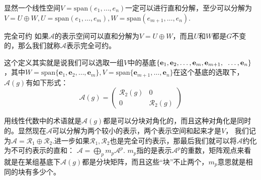 显然一个线性空间$V=\mathrm{span}(e_1,\ldots,e_n)$一定可以进行直和分解，至少可以分解为$V=U\oplus W,U=\mathrm{span}(e_1,\ldots,e_m),W=\mathrm{span}(e_{m+1},\ldots,e_n)$.
\begin{define}{完全可约}
    如果$\mathscr{A}$的表示空间可以直和分解为$V=U\oplus W$，而且$U$和$W$都是$G$不变的，那么我们就称$\mathscr{A}$表示完全可约。
\end{define}
这个定义其实就是说我们可以选取一组$V$中的基底$\left\{\mathbf{e}_1,\mathbf{e}_2,\ldots,\mathbf{e}_m,\mathbf{e}_{m+1},\right.\\\left.\ldots,\mathbf{e}_n\right\}$，其中$W=\mathrm{span}\{\mathbf{e}_1,\mathbf{e}_2,\ldots,\mathbf{e}_m\},V=\mathrm{span}\{\mathbf{e}_{m+1},\ldots,\mathbf{e}_n\}$在这个基底的选取下，
$\mathcal{A}(g)$有如下形式：
\begin{equation}
    \label{eq:D.3}
    \mathcal{A}(g)=\begin{pmatrix}
        \mathcal{R}_2(g) &{0} \\
         {0} & \mathcal{R}_2(g)
       \end{pmatrix}
\end{equation}

用线性代数中的术语就是$\mathcal{A}(g)$都是可以分块对角化的，而且这种对角化是同时的。显然现在$\mathscr{A}$可以分解为两个较小的表示，两个表示空间和起来才是$V$，
我们记为$\mathscr{A}=\mathscr{R}_1\oplus\mathscr{R}_2$.进一步如果$\mathscr{R}_1,\mathscr{R}_2$也是完全可约表示，那最后我们就可以将$\mathscr{A}$约化为不可约表示的直和：
$\mathscr{A}=\bigoplus_p m_p\mathscr{A}^p$. $m_p$指的是表示$\mathscr{A}^p$的重数，矩阵观点来看就是在某组基底下$\mathcal{A}(g)$都是分块矩阵，而且这些“块”不止两个，$m_p$意思就是相同的块有多少个。

